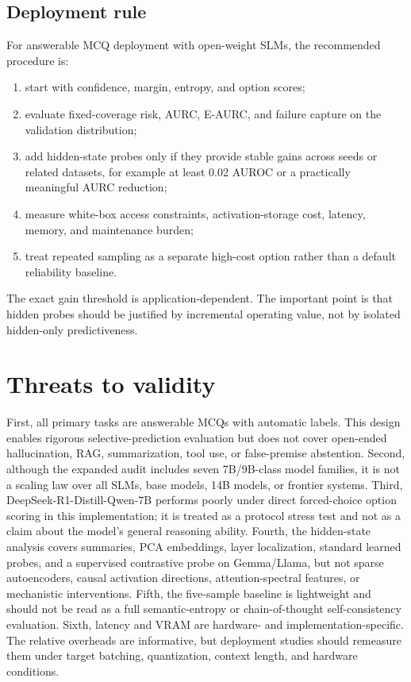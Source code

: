 \documentclass[preprint,12pt,authoryear]{elsarticle}
\begin{document}
\subsection{Deployment rule}
For answerable MCQ deployment with open-weight SLMs, the recommended procedure is:
\begin{enumerate}
    \item start with confidence, margin, entropy, and option scores;
    \item evaluate fixed-coverage risk, AURC, E-AURC, and failure capture on the validation distribution;
    \item add hidden-state probes only if they provide stable gains across seeds or related datasets, for example at least 0.02 AUROC or a practically meaningful AURC reduction;
    \item measure white-box access constraints, activation-storage cost, latency, memory, and maintenance burden;
    \item treat repeated sampling as a separate high-cost option rather than a default reliability baseline.
\end{enumerate}
The exact gain threshold is application-dependent. The important point is that hidden probes should be justified by incremental operating value, not by isolated hidden-only predictiveness.

\section{Threats to validity}
First, all primary tasks are answerable MCQs with automatic labels. This design enables rigorous selective-prediction evaluation but does not cover open-ended hallucination, RAG, summarization, tool use, or false-premise abstention. Second, although the expanded audit includes seven 7B/9B-class model families, it is not a scaling law over all SLMs, base models, 14B models, or frontier systems. Third, DeepSeek-R1-Distill-Qwen-7B performs poorly under direct forced-choice option scoring in this implementation; it is treated as a protocol stress test and not as a claim about the model's general reasoning ability. Fourth, the hidden-state analysis covers summaries, PCA embeddings, layer localization, standard learned probes, and a supervised contrastive probe on Gemma/Llama, but not sparse autoencoders, causal activation directions, attention-spectral features, or mechanistic interventions. Fifth, the five-sample baseline is lightweight and should not be read as a full semantic-entropy or chain-of-thought self-consistency evaluation. Sixth, latency and VRAM are hardware- and implementation-specific. The relative overheads are informative, but deployment studies should remeasure them under target batching, quantization, context length, and hardware conditions.
\end{document}
